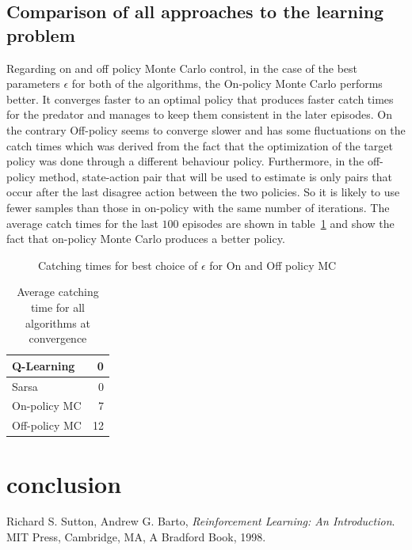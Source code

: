 \documentclass[paper=a4, fontsize=11pt]{scrartcl}
\numberwithin{equation}{section}		%
\numberwithin{figure}{section}			%
\numberwithin{table}{section}				%
\begin{document}
\subsection{Comparison of all approaches to the learning problem}
Regarding on and off policy Monte Carlo control, in the case of the best parameters $\epsilon$ for both of the algorithms, the On-policy Monte Carlo performs better. It converges faster to an optimal policy that produces faster catch times for the predator and manages to keep them consistent in the later episodes. On the contrary Off-policy seems to converge slower and has some fluctuations on the catch times which was derived from the fact that the optimization of the target policy was done through a different behaviour policy. Furthermore, in the off-policy method, state-action pair that will be used to estimate is only pairs that occur after the last disagree action between the two policies. So it is likely to use fewer samples than those in on-policy with the same number of iterations. The average catch times for the last $100$ episodes are shown in table~\ref{compavg} and show the fact that on-policy Monte Carlo produces a better policy.
\begin{figure}[H] \centering
\caption{Catching times for best choice of $\epsilon$ for On and Off policy MC}\label{figure:onoffcomp} 
\end{figure}

\begin{table}[H]
\caption{Average catching time for all algorithms at convergence}
\centering
\begin{tabular}{|l|r|}
\hline
Q-Learning& 0 \\\hline
Sarsa& 0 \\\hline
On-policy MC& 7\\\hline
Off-policy MC& 12\\\hline
\end{tabular}
\label{compavg}
\end{table}

\section{conclusion}
\label{discussion}



\begin{thebibliography}{9}

  Richard S. Sutton, Andrew G. Barto,
  \emph{Reinforcement Learning: An Introduction}.
  MIT Press, Cambridge, MA, 
  A Bradford Book,
  1998.

\end{thebibliography}

\end{document}
